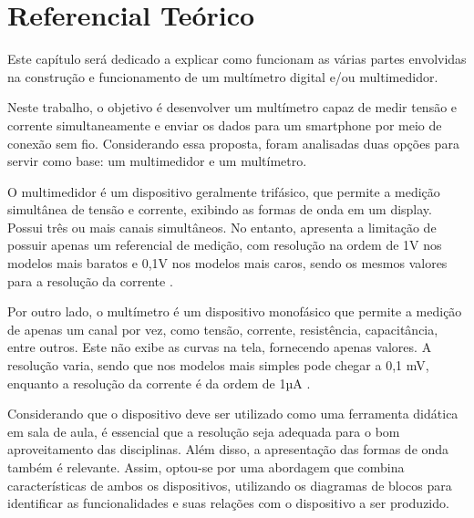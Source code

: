 \chapter{Referencial Teórico}\label{cap:referencialTeorico}

Este capítulo será dedicado a explicar como funcionam as várias partes envolvidas na construção e funcionamento de um multímetro digital e/ou multimedidor.

Neste trabalho, o objetivo é desenvolver um multímetro capaz de medir tensão e corrente simultaneamente e enviar os dados para um smartphone por meio de conexão sem fio. Considerando essa proposta, foram analisadas duas opções para servir como base: um multimedidor e um multímetro.

O multimedidor é um dispositivo geralmente trifásico, que permite a medição simultânea de tensão e corrente, exibindo as formas de onda em um display. Possui três ou mais canais simultâneos. No entanto, apresenta a limitação de possuir apenas um referencial de medição, com resolução na ordem de 1V nos modelos mais baratos e 0,1V nos modelos mais caros, sendo os mesmos valores para a resolução da corrente \cite{fluke434}.

Por outro lado, o multímetro é um dispositivo monofásico que permite a medição de apenas um canal por vez, como tensão, corrente, resistência, capacitância, entre outros. Este não exibe as curvas na tela, fornecendo apenas valores. A resolução varia, sendo que nos modelos mais simples pode chegar a 0,1 mV, enquanto a resolução da corrente é da ordem de 1µA \cite{et1100}.

Considerando que o dispositivo deve ser utilizado como uma ferramenta didática em sala de aula, é essencial que a resolução seja adequada para o bom aproveitamento das disciplinas. Além disso, a apresentação das formas de onda também é relevante. Assim, optou-se por uma abordagem que combina características de ambos os dispositivos, utilizando os diagramas de blocos para identificar as funcionalidades e suas relações com o dispositivo a ser produzido.

